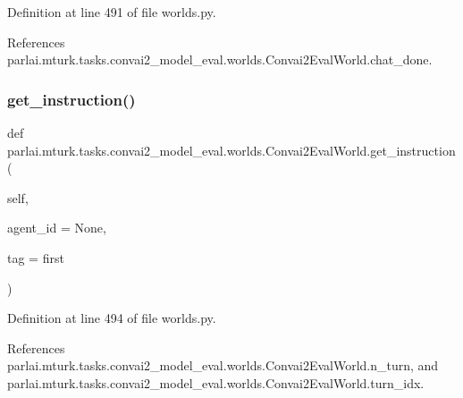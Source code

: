 Definition at line 491 of file worlds.\+py.



References parlai.\+mturk.\+tasks.\+convai2\+\_\+model\+\_\+eval.\+worlds.\+Convai2\+Eval\+World.\+chat\+\_\+done.

\mbox{\label{classparlai_1_1mturk_1_1tasks_1_1convai2__model__eval_1_1worlds_1_1Convai2EvalWorld_a297aba27c40c516873f178758c503079}} 
\subsubsection{\texorpdfstring{get\+\_\+instruction()}{get\_instruction()}}
{\footnotesize\ttfamily def parlai.\+mturk.\+tasks.\+convai2\+\_\+model\+\_\+eval.\+worlds.\+Convai2\+Eval\+World.\+get\+\_\+instruction (\begin{DoxyParamCaption}\item[{}]{self,  }\item[{}]{agent\+\_\+id = {\ttfamily None},  }\item[{}]{tag = {\ttfamily \textquotesingle{}first\textquotesingle{}} }\end{DoxyParamCaption})}



Definition at line 494 of file worlds.\+py.



References parlai.\+mturk.\+tasks.\+convai2\+\_\+model\+\_\+eval.\+worlds.\+Convai2\+Eval\+World.\+n\+\_\+turn, and parlai.\+mturk.\+tasks.\+convai2\+\_\+model\+\_\+eval.\+worlds.\+Convai2\+Eval\+World.\+turn\+\_\+idx.



